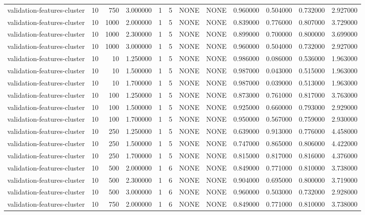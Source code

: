 \begin{tabular}{lrrrllllrrrr}
validation-features-cluster & 10 & 750 & 3.000000 & 1 & 5 & NONE & NONE & 0.960000 & 0.504000 & 0.732000 & 2.927000 \\
validation-features-cluster & 10 & 1000 & 2.000000 & 1 & 5 & NONE & NONE & 0.839000 & 0.776000 & 0.807000 & 3.729000 \\
validation-features-cluster & 10 & 1000 & 2.300000 & 1 & 5 & NONE & NONE & 0.899000 & 0.700000 & 0.800000 & 3.699000 \\
validation-features-cluster & 10 & 1000 & 3.000000 & 1 & 5 & NONE & NONE & 0.960000 & 0.504000 & 0.732000 & 2.927000 \\
validation-features-cluster & 10 & 10 & 1.250000 & 1 & 5 & NONE & NONE & 0.986000 & 0.086000 & 0.536000 & 1.963000 \\
validation-features-cluster & 10 & 10 & 1.500000 & 1 & 5 & NONE & NONE & 0.987000 & 0.043000 & 0.515000 & 1.963000 \\
validation-features-cluster & 10 & 10 & 1.700000 & 1 & 5 & NONE & NONE & 0.987000 & 0.039000 & 0.513000 & 1.963000 \\
validation-features-cluster & 10 & 100 & 1.250000 & 1 & 5 & NONE & NONE & 0.873000 & 0.761000 & 0.817000 & 3.763000 \\
validation-features-cluster & 10 & 100 & 1.500000 & 1 & 5 & NONE & NONE & 0.925000 & 0.660000 & 0.793000 & 2.929000 \\
validation-features-cluster & 10 & 100 & 1.700000 & 1 & 5 & NONE & NONE & 0.950000 & 0.567000 & 0.759000 & 2.930000 \\
validation-features-cluster & 10 & 250 & 1.250000 & 1 & 5 & NONE & NONE & 0.639000 & 0.913000 & 0.776000 & 4.458000 \\
validation-features-cluster & 10 & 250 & 1.500000 & 1 & 5 & NONE & NONE & 0.747000 & 0.865000 & 0.806000 & 4.422000 \\
validation-features-cluster & 10 & 250 & 1.700000 & 1 & 5 & NONE & NONE & 0.815000 & 0.817000 & 0.816000 & 4.376000 \\
validation-features-cluster & 10 & 500 & 2.000000 & 1 & 6 & NONE & NONE & 0.849000 & 0.771000 & 0.810000 & 3.738000 \\
validation-features-cluster & 10 & 500 & 2.300000 & 1 & 6 & NONE & NONE & 0.904000 & 0.695000 & 0.800000 & 3.719000 \\
validation-features-cluster & 10 & 500 & 3.000000 & 1 & 6 & NONE & NONE & 0.960000 & 0.503000 & 0.732000 & 2.928000 \\
validation-features-cluster & 10 & 750 & 2.000000 & 1 & 6 & NONE & NONE & 0.849000 & 0.771000 & 0.810000 & 3.738000 \\

\end{tabular}

